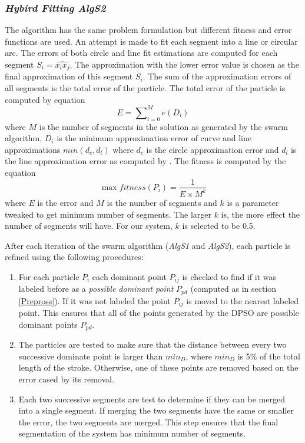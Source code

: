 \documentclass{article}
\begin{document}
 \subsubsection{\textit{Hybird Fitting \textsl{AlgS2}}}
The algorithm has the same problem formulation but different fitness and error functions are used. An attempt is made to fit each segment into a line or circular arc. The errors of both circle and line fit estimations are computed for each segment $S_i=\widehat{x_ix_j}$. The approximation with the lower error value is chosen as the final approximation of this segment $S_i$\cite{CruveDivisionSwarm}. The sum of the approximation errors of all segments is the total error of the particle.  The total error of the particle is computed by equation %
 \begin{equation}
E=\sum\nolimits_{i = 0}^M e(D_i) 
\label{eq:errorSwarm2}
\end{equation}where $M$ is the number of segments in the solution as generated by the swarm algorithm, $D_i$ is the minimum approximation error of curve and line approximations $min(d_c,d_l)$ where $d_c$ is the circle approximation error and $d_l$ is the line approximation error as computed by \cite{CruveDivisionSwarm}.  The fitness is computed by the equation %
\begin{equation}
\max fitness(P_i ) = \frac{1}{{E \times M^k }}
\label{eq:fitnessSwarm2}
\end{equation} where $E$ is the error and $M$ is the number of segments and $k$ is a parameter tweaked to get minimum number of segments. The larger $k$ is, the more effect the number of segments will have. For our system, $k$ is selected to be 0.5\cite{CruveDivisionSwarm}.

After each iteration of the swarm algorithm (\textsl{AlgS1} and \textsl{AlgS2}), each particle is refined using the following procedures: 
\begin{enumerate}
	\item For each particle $P_i$ each dominant point $P_{ij}$ is checked to find if it was labeled before as a \textit{possible dominant point} $P_{pd}$ (computed as in section \ref{Prepross}). If it was not labeled the point $P_{ij}$ is moved to the nearest labeled point. This ensures that all of the points generated by the DPSO are possible dominant points $P_{pd}$. 
	\item The particles are tested to make sure that the distance between every two successive dominate point is larger than $min_D$, where $min_D$ is 5\% of the total length of the stroke.  Otherwise, one of these points are removed based on the error cased by its removal.
	\item Each two successive segments are test to determine if they can be merged into a single segment. If merging the two segments have the same or smaller the error, the two segments are merged. This step ensures that the final segmentation of the system has minimum number of segments. 
\end{enumerate}
\end{document}
